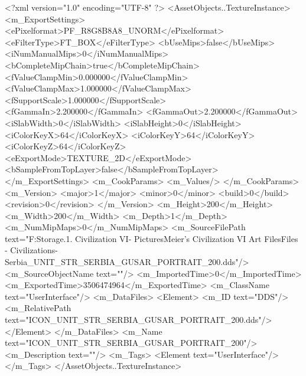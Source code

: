 <?xml version="1.0" encoding="UTF-8" ?>
<AssetObjects..TextureInstance>
	<m_ExportSettings>
		<ePixelformat>PF_R8G8B8A8_UNORM</ePixelformat>
		<eFilterType>FT_BOX</eFilterType>
		<bUseMips>false</bUseMips>
		<iNumManualMips>0</iNumManualMips>
		<bCompleteMipChain>true</bCompleteMipChain>
		<fValueClampMin>0.000000</fValueClampMin>
		<fValueClampMax>1.000000</fValueClampMax>
		<fSupportScale>1.000000</fSupportScale>
		<fGammaIn>2.200000</fGammaIn>
		<fGammaOut>2.200000</fGammaOut>
		<iSlabWidth>0</iSlabWidth>
		<iSlabHeight>0</iSlabHeight>
		<iColorKeyX>64</iColorKeyX>
		<iColorKeyY>64</iColorKeyY>
		<iColorKeyZ>64</iColorKeyZ>
		<eExportMode>TEXTURE_2D</eExportMode>
		<bSampleFromTopLayer>false</bSampleFromTopLayer>
	</m_ExportSettings>
	<m_CookParams>
		<m_Values/>
	</m_CookParams>
	<m_Version>
		<major>1</major>
		<minor>0</minor>
		<build>0</build>
		<revision>0</revision>
	</m_Version>
	<m_Height>200</m_Height>
	<m_Width>200</m_Width>
	<m_Depth>1</m_Depth>
	<m_NumMipMaps>0</m_NumMipMaps>
	<m_SourceFilePath text="F:\Mod Storage\2.1. Civilization VI\Mods\Archive - Pictures\Sid Meier's Civilization VI Art Files\Art Files - Civilizations\Civilization - Serbia\ICON_UNIT_STR_SERBIA_GUSAR_PORTRAIT_200.dds"/>
	<m_SourceObjectName text=""/>
	<m_ImportedTime>0</m_ImportedTime>
	<m_ExportedTime>3506474964</m_ExportedTime>
	<m_ClassName text="UserInterface"/>
	<m_DataFiles>
		<Element>
			<m_ID text="DDS"/>
			<m_RelativePath text="ICON_UNIT_STR_SERBIA_GUSAR_PORTRAIT_200.dds"/>
		</Element>
	</m_DataFiles>
	<m_Name text="ICON_UNIT_STR_SERBIA_GUSAR_PORTRAIT_200"/>
	<m_Description text=""/>
	<m_Tags>
		<Element text="UserInterface"/>
	</m_Tags>
</AssetObjects..TextureInstance>

